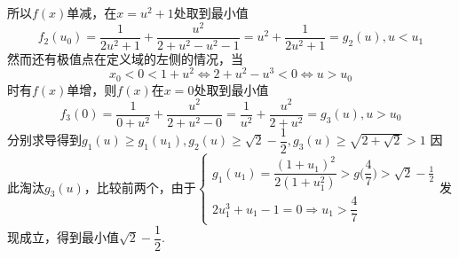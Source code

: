 \begin{solution}
    所以$f(x)$单减，在$x=u^2+1$处取到最小值
    \[f_2(u_0)=\dfrac{1}{2u^2+1}+\dfrac{u^2}{2+u^2-u^2-1}=u^2+\dfrac{1}{2u^2+1}=g_2(u),u<u_1\]
    然而还有极值点在定义域的左侧的情况，当
    \[x_0<0<1+u^2\Leftrightarrow2+u^2-u^3<0\Leftrightarrow u>u_0\]时有$f(x)$单增，则$f(x)$在$x=0$处取到最小值
    \[f_3(0)=\dfrac{1}{0+u^2}+\dfrac{u^2}{2+u^2-0}=\dfrac{1}{u^2}+\dfrac{u^2}{2+u^2}=g_3(u),u>u_0\]
    分别求导得到$g_1(u)\geq g_1(u_1),g_2(u)\geq \sqrt2-\dfrac12,g_3(u)\geq\sqrt{2+\sqrt2}>1$
    因此淘汰$g_3(u)$，比较前两个，由于$\begin{cases}g_1(u_1)=\dfrac{(1+u_1)^2}{2(1+u_1^2)}>g\bigg(\dfrac47\bigg)>\sqrt2-\frac12\\2u_1^3+u_1-1=0\Rightarrow u_1>\dfrac47\end{cases}$发现成立，得到最小值$\sqrt2-\dfrac12$.
\end{solution}